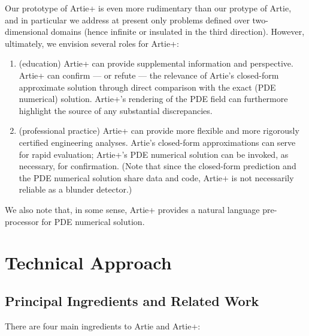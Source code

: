 \documentclass[preprint,12pt]{article}
\begin{document}
Our prototype of Artie+ is even more rudimentary than our protype of Artie, and in particular we address at present only problems defined over two-dimensional domains (hence infinite or insulated in the third direction). However, ultimately, we envision several roles for Artie+:

\begin{enumerate}
\item (education) Artie+ can provide supplemental  information and perspective. Artie+ can confirm --- or refute --- the relevance of Artie's closed-form approximate solution through direct comparison with the exact (PDE numerical) solution. Artie+'s rendering of the PDE field can furthermore highlight the source of any substantial discrepancies.

\item (professional practice) Artie+ can provide more flexible and more rigorously certified engineering analyses. Artie's closed-form approximations can serve for rapid evaluation; Artie+'s PDE numerical solution can be invoked, as necessary, for confirmation. (Note that since the closed-form prediction and the PDE numerical solution share data and code, Artie+ is not necessarily reliable as a blunder detector.)
\end{enumerate}
We also note that, in some sense, Artie+ provides a natural language pre-processor for PDE numerical solution.
\section{Technical Approach}

\subsection{Principal Ingredients and Related Work}

There are four main ingredients to Artie and Artie+:
\end{document}
